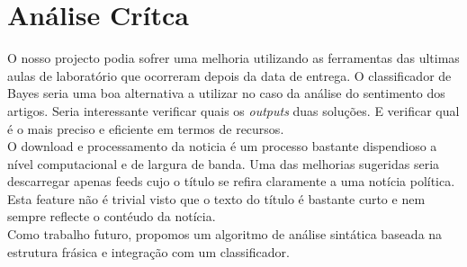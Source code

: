 \section{Análise Crítca}
\hspace{15pt}O nosso projecto podia sofrer uma melhoria utilizando as ferramentas das ultimas aulas de laboratório que ocorreram depois da data de entrega. O classificador de Bayes seria uma boa alternativa a utilizar no caso da análise do sentimento dos artigos. Seria interessante verificar quais os \textit{outputs} duas soluções. E verificar qual é o mais preciso e eficiente em termos de recursos. \\
O download e processamento da noticia é um processo bastante dispendioso a nível computacional e de largura de banda. Uma das melhorias sugeridas seria descarregar apenas feeds cujo o título se refira claramente a uma notícia política. Esta feature não é trivial visto que o texto do título é bastante curto e nem sempre reflecte o contéudo da notícia.\\
Como trabalho futuro, propomos um algoritmo de análise sintática baseada na estrutura frásica e integração com um classificador. \\
